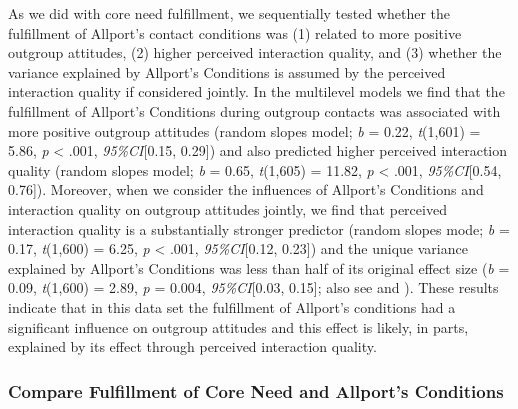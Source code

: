 As we did with core need fulfillment, we sequentially tested whether the
fulfillment of Allport's contact conditions was (1) related to more
positive outgroup attitudes, (2) higher perceived interaction quality,
and (3) whether the variance explained by Allport's Conditions is
assumed by the perceived interaction quality if considered jointly. In
the multilevel models we find that the fulfillment of Allport's
Conditions during outgroup contacts was associated with more positive
outgroup attitudes (random slopes model; \textit{b} = 0.22,
\textit{t}(1,601) = 5.86, \textit{p} \textless{} .001,
\textit{95\%CI}{[}0.15, 0.29{]}) and also predicted higher perceived
interaction quality (random slopes model; \textit{b} = 0.65,
\textit{t}(1,605) = 11.82, \textit{p} \textless{} .001,
\textit{95\%CI}{[}0.54, 0.76{]}). Moreover, when we consider the
influences of Allport's Conditions and interaction quality on outgroup
attitudes jointly, we find that perceived interaction quality is a
substantially stronger predictor (random slopes mode; \textit{b} = 0.17,
\textit{t}(1,600) = 6.25, \textit{p} \textless{} .001,
\textit{95\%CI}{[}0.12, 0.23{]}) and the unique variance explained by
Allport's Conditions was less than half of its original effect size
(\textit{b} = 0.09, \textit{t}(1,600) = 2.89, \textit{p} = 0.004,
\textit{95\%CI}{[}0.03, 0.15{]}; also see
 and
). These results indicate that in
this data set the fulfillment of Allport's conditions had a significant
influence on outgroup attitudes and this effect is likely, in parts,
explained by its effect through perceived interaction quality.

\subsubsection{Compare Fulfillment of Core Need and Allport's Conditions}

